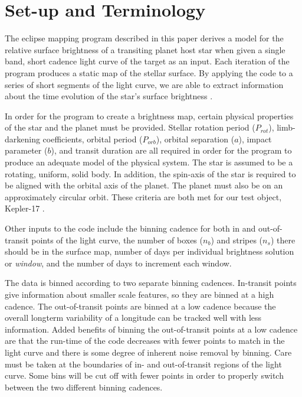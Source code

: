 

\section{Set-up and Terminology \label{terminology}}
The eclipse mapping program described in this paper derives a model for the relative surface brightness of a transiting planet host star when given a single band, short cadence light curve of the target as an input. Each iteration of the program produces a static map of the stellar surface. By applying the code to a series of short segments of the light curve, we are able to extract information about the time evolution of the star's surface brightness \cite{Huber2009}.  

In order for the program to create a brightness map, certain physical properties of the star and the planet must be provided. Stellar rotation period ($P_{rot}$), limb-darkening coefficients, orbital period ($P_{orb}$), orbital separation ($a$), impact parameter ($b$), and transit duration are all required in order for the program to produce an adequate model of the physical system. The star is assumed to be a rotating, uniform, solid body. In addition, the spin-axis of the star is required to be aligned with the orbital axis of the planet. The planet must also be on an approximately circular orbit. These criteria are both met for our test object, Kepler-17 \cite{Borucki2011}.

Other inputs to the code include the binning cadence for both in and out-of-transit points of the light curve, the number of boxes ($n_b$) and stripes ($n_s$) there should be in the surface map, number of days per individual brightness solution or {\it window}, and the number of days to increment each window.

The data is binned according to two separate binning cadences. In-transit points give information about smaller scale features, so they are binned at a high cadence. The out-of-transit points are binned at a low cadence because the overall longterm variability of a longitude can be tracked well with less information. Added benefits of binning the out-of-transit points at a low cadence are that the run-time of the code decreases with fewer points to match in the light curve and there is some degree of inherent noise removal by binning. Care must be taken at the boundaries of in- and out-of-transit regions of the light curve. Some bins will be cut off with fewer points in order to properly switch between the two different binning cadences.

